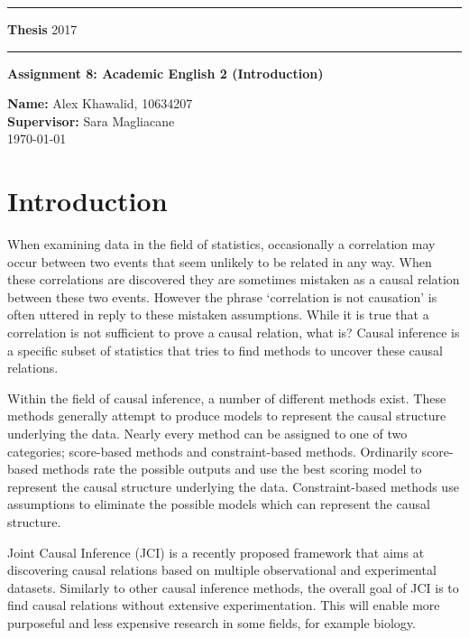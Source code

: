 \documentclass[11pt]{article}
\begin{document}
\rule{\textwidth}{1pt}

\textbf{Thesis} \hfill 2017
\rule{\textwidth}{1pt}
\vspace*{20pt}


\textbf{Assignment 8:  Academic English 2 (Introduction)}

\textbf{Name:} Alex Khawalid, 10634207\\
\textbf{Supervisor:} Sara Magliacane\\
\today	
\section{Introduction}
When examining data in the field of statistics, occasionally a correlation may occur between two events that seem unlikely to be related in any way. When these correlations are discovered they are sometimes mistaken as a causal relation between these two events. However the phrase `correlation is not causation' is often uttered in reply to these mistaken assumptions. While it is true that a correlation is not sufficient to prove a causal relation, what is? Causal inference \cite{Pearl2009inference,Spirtes2000} is a specific subset of statistics that tries to find methods to uncover these causal relations.

Within the field of causal inference, a number of different methods exist. These methods generally attempt to produce models to represent the causal structure underlying the data. Nearly every method can be assigned to one of two categories; score-based methods and constraint-based methods. Ordinarily score-based methods rate the possible outputs and use the best scoring model to represent the causal structure underlying the data. Constraint-based methods use assumptions to eliminate the possible models which can represent the causal structure.

Joint Causal Inference (JCI)\cite{jci} is a recently proposed framework that aims at discovering causal relations based on multiple observational and experimental datasets. Similarly to other causal inference methods, the overall goal of JCI is to find causal relations without extensive experimentation. This will enable more purposeful and less expensive research in some fields, for example biology.
\end{document}
